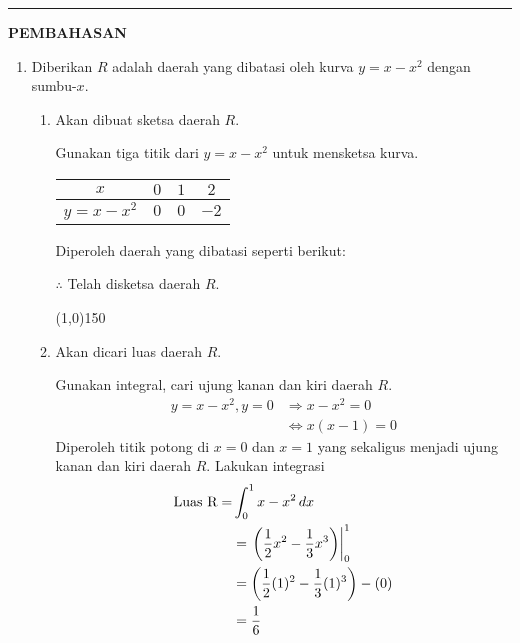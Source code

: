 \vspace{0.2cm}\hrule height 1pt\vspace{0.5cm}


\begin{center}
\textbf{\large{PEMBAHASAN}}
\end{center}
\begin{enumerate}[leftmargin=*, label={\arabic*}.]
\item Diberikan $R$ adalah daerah yang dibatasi oleh kurva $y=x-x^{2}$ 
dengan sumbu-$x$.
    \begin{enumerate}[label={\alph*}.]
    \item Akan dibuat sketsa daerah $R$.
    
    Gunakan tiga titik dari $y=x-x^{2}$ untuk mensketsa kurva.
    \begin{center}
        \begin{tabular}{|c|c|c|c|}\hline
            $x$ & $0$ & $1$ & $2$ \\ \hline
            $y=x-x^{2}$ & $0$ & $0$ & $-2$ \\ \hline
        \end{tabular}
    \end{center}
    Diperoleh daerah yang dibatasi seperti berikut:

    

    $\therefore$ Telah disketsa daerah $R$.


\begin{center}\line(1,0){150}\end{center}


    \item Akan dicari luas daerah $R$.
    
    Gunakan integral, cari ujung kanan dan kiri daerah $R$.
    \begin{align*}
        y=x-x^{2}, y=0 &\Longrightarrow x-x^{2}=0\\
        &\iff x(x-1) = 0
    \end{align*}
    Diperoleh titik potong di $x=0$ dan $x=1$ yang sekaligus menjadi ujung kanan 
    dan kiri daerah $R$. Lakukan integrasi
    \begin{align*}
        \text{Luas R} = &\int_{0}^{1} x-x^{2}\,dx\\
        &=\eval{\frac{1}{2}x^{2}-\frac{1}{3}x^{3}}{0}{1}\\
        &=\brk*{\frac{1}{2}(1)^{2}-\frac{1}{3}(1)^{3}}-(0)\\
        &=\frac{1}{6}
    \end{align*}


\end{enumerate}
\end{enumerate}

